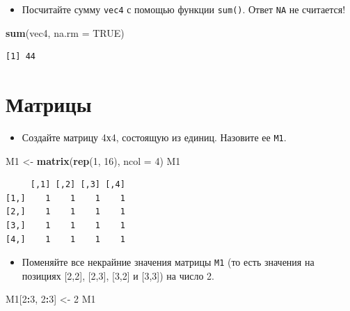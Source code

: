\documentclass[
]{book}
\newenvironment{Shaded}{\begin{snugshade}}{\end{snugshade}}
\newcommand{\DataTypeTok}[1]{\textcolor[rgb]{0.13,0.29,0.53}{#1}}
\newcommand{\DecValTok}[1]{\textcolor[rgb]{0.00,0.00,0.81}{#1}}
\newcommand{\KeywordTok}[1]{\textcolor[rgb]{0.13,0.29,0.53}{\textbf{#1}}}
\newcommand{\NormalTok}[1]{#1}
\newcommand{\OperatorTok}[1]{\textcolor[rgb]{0.81,0.36,0.00}{\textbf{#1}}}
\newcommand{\OtherTok}[1]{\textcolor[rgb]{0.56,0.35,0.01}{#1}}
\newcommand{\StringTok}[1]{\textcolor[rgb]{0.31,0.60,0.02}{#1}}
\providecommand{\tightlist}{%
  \setlength{\itemsep}{0pt}\setlength{\parskip}{0pt}}
\begin{document}
\begin{itemize}
\tightlist
\item
  Посчитайте сумму \texttt{vec4} с помощью функции \texttt{sum()}. Ответ \texttt{NA} не считается!
\end{itemize}

\begin{Shaded}
\begin{Highlighting}[]
\KeywordTok{sum}\NormalTok{(vec4, }\DataTypeTok{na.rm =} \OtherTok{TRUE}\NormalTok{)}
\end{Highlighting}
\end{Shaded}

\begin{verbatim}
[1] 44
\end{verbatim}

\hypertarget{solution_matrix}{%
\section{Матрицы}\label{solution_matrix}}

\begin{itemize}
\tightlist
\item
  Создайте матрицу 4х4, состоящую из единиц. Назовите ее \texttt{M1}.
\end{itemize}

\begin{Shaded}
\begin{Highlighting}[]
\NormalTok{M1 <-}\StringTok{ }\KeywordTok{matrix}\NormalTok{(}\KeywordTok{rep}\NormalTok{(}\DecValTok{1}\NormalTok{, }\DecValTok{16}\NormalTok{), }\DataTypeTok{ncol =} \DecValTok{4}\NormalTok{)}
\NormalTok{M1}
\end{Highlighting}
\end{Shaded}

\begin{verbatim}
     [,1] [,2] [,3] [,4]
[1,]    1    1    1    1
[2,]    1    1    1    1
[3,]    1    1    1    1
[4,]    1    1    1    1
\end{verbatim}

\begin{itemize}
\tightlist
\item
  Поменяйте все некрайние значения матрицы \texttt{M1} (то есть значения на позициях {[}2,2{]}, {[}2,3{]}, {[}3,2{]} и {[}3,3{]}) на число 2.
\end{itemize}

\begin{Shaded}
\begin{Highlighting}[]
\NormalTok{M1[}\DecValTok{2}\OperatorTok{:}\DecValTok{3}\NormalTok{, }\DecValTok{2}\OperatorTok{:}\DecValTok{3}\NormalTok{] <-}\StringTok{ }\DecValTok{2}
\NormalTok{M1}
\end{Highlighting}
\end{Shaded}
\end{document}
